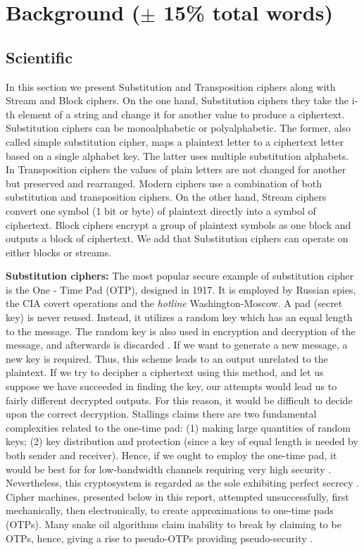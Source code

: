 \section{Background ($\pm$ 15\% total words)}
\subsection{Scientific}

In this section we present Substitution and Transposition ciphers along with Stream and Block ciphers. On the one hand, Substitution ciphers they take the i-th element of a string and change it for another value to produce a ciphertext. Substitution ciphers can be monoalphabetic or polyalphabetic. The former, also called simple substitution cipher, maps a plaintext letter to a ciphertext letter based on a single alphabet key. The latter uses multiple substitution alphabets. In Transposition ciphers the values of plain letters are not changed for another but preserved and rearranged. Modern ciphers use a combination of both substitution and transposition ciphers. On the other hand, Stream ciphers convert one symbol (1 bit or byte) of plaintext directly into a symbol of ciphertext. Block ciphers encrypt a group of plaintext symbols as one block and outputs a block of ciphertext. We add that Substitution ciphers can operate on either blocks or streams. 

\textbf{Substitution ciphers:} 
The most popular secure example of substitution cipher is the One - Time Pad (OTP), designed in 1917. It is employed by Russian spies, the CIA covert operations and the \emph{hotline} Washington-Moscow. A pad (secret key) is never reused. Instead, it utilizes a random key which has an equal length to the message. The random key is also used in encryption and decryption of the message, and afterwards is discarded \cite{stallings2011}. If we want to generate a new message, a new key is required. Thus, this scheme leads to an output unrelated to the plaintext. If we try to decipher a ciphertext using this method, and let us suppose we have succeeded in finding the key, our attempts would lead us to fairly different decrypted outputs. For this reason, it would be difficult to decide upon the correct decryption. Stallings claims there are two fundamental complexities related to the one-time pad: (1) making large quantities of random keys; (2) key distribution and protection (since a key of equal length is needed by both sender and receiver). Hence, if we ought to employ the one-time pad, it would be best for  for low-bandwidth channels requiring very high security \cite{stallings2011}. Nevertheless, this cryptosystem is regarded as the sole exhibiting perfect secrecy \cite{stallings2011}. Cipher machines, presented below in this report, attempted unsuccessfully, first mechanically, then electronically, to create approximations to one-time pads (OTPs). Many snake oil algorithms claim inability to break by claiming to be OTPs, hence, giving a rise to pseudo-OTPs providing pseudo-security \cite{curtin1998}.

